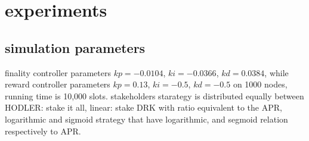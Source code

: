 \documentclass{article}
\begin{document}
\section{experiments}
\begin{description}
  \subsection{simulation parameters}
  \item finality controller parameters  $kp=-0.0104$, $ki=-0.0366$, $kd=0.0384$, while reward controller parameters  $kp=0.13$, $ki=-0.5$, $kd=-0.5$ on 1000 nodes, running time is 10,000 slots. stakeholders starategy is distributed equally between HODLER: stake it all, linear: stake DRK with ratio equivalent to the APR, logarithmic and sigmoid strategy that have logarithmic, and segmoid relation respectively to APR.


\end{description}
\end{document}
